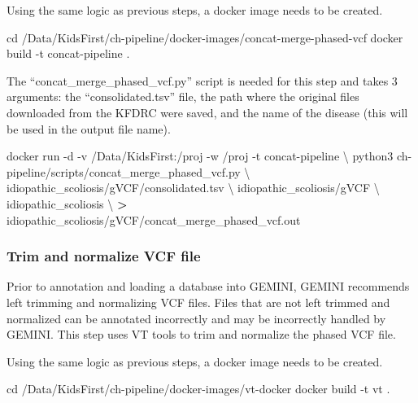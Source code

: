 \documentclass[]{article}
\newenvironment{Shaded}{\begin{snugshade}}{\end{snugshade}}
\newcommand{\BuiltInTok}[1]{#1}
\newcommand{\ExtensionTok}[1]{#1}
\newcommand{\NormalTok}[1]{#1}
\newcommand{\OperatorTok}[1]{\textcolor[rgb]{0.81,0.36,0.00}{\textbf{#1}}}
\begin{document}
Using the same logic as previous steps, a docker image needs to be
created.

\begin{Shaded}
\begin{Highlighting}[]
\BuiltInTok{cd}\NormalTok{ /Data/KidsFirst/ch-pipeline/docker-images/concat-merge-phased-vcf}
\ExtensionTok{docker}\NormalTok{ build -t concat-pipeline .}
\end{Highlighting}
\end{Shaded}

The ``concat\_merge\_phased\_vcf.py'' script is needed for this step and
takes 3 arguments: the ``consolidated.tsv'' file, the path where the
original files downloaded from the KFDRC were saved, and the name of the
disease (this will be used in the output file name).

\begin{Shaded}
\begin{Highlighting}[]
\ExtensionTok{docker}\NormalTok{ run -d -v /Data/KidsFirst:/proj -w /proj -t concat-pipeline \textbackslash{}}
\NormalTok{  python3 ch-pipeline/scripts/concat_merge_phased_vcf.py \textbackslash{}}
\NormalTok{  idiopathic_scoliosis/gVCF/consolidated.tsv \textbackslash{}}
\NormalTok{  idiopathic_scoliosis/gVCF \textbackslash{}}
\NormalTok{  idiopathic_scoliosis \textbackslash{}}
  \OperatorTok{>}\NormalTok{ idiopathic_scoliosis/gVCF/concat_merge_phased_vcf.out}
\end{Highlighting}
\end{Shaded}

\hypertarget{trim-and-normalize-vcf-file}{%
\subsubsection{Trim and normalize VCF
file}\label{trim-and-normalize-vcf-file}}

Prior to annotation and loading a database into GEMINI, GEMINI
recommends left trimming and normalizing VCF files. Files that are not
left trimmed and normalized can be annotated incorrectly and may be
incorrectly handled by GEMINI. This step uses VT tools to trim and
normalize the phased VCF file.

Using the same logic as previous steps, a docker image needs to be
created.

\begin{Shaded}
\begin{Highlighting}[]
\BuiltInTok{cd}\NormalTok{ /Data/KidsFirst/ch-pipeline/docker-images/vt-docker}
\ExtensionTok{docker}\NormalTok{ build -t vt .}
\end{Highlighting}
\end{Shaded}
\end{document}
